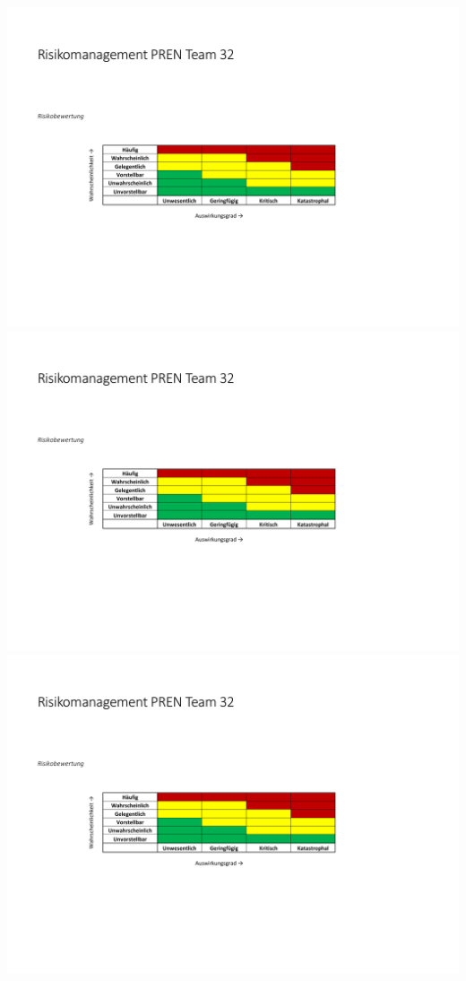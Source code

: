 \documentclass[a4paper,10pt,fleqn]{article} %
\begin{document}
\begin{appendix}
\begin{landscape}
   			\newpage  			
   			\includegraphics[page=4,scale=1,clip,trim=20mm 22mm 21mm 22mm]{Anhang/Risikomanagement.pdf}
   			\newpage  			
   			\includegraphics[page=5,scale=1,clip,trim=20mm 22mm 21mm 22mm]{Anhang/Risikomanagement.pdf}	
   			\newpage  			
   			\includegraphics[page=6,scale=1,clip,trim=20mm 22mm 21mm 22mm]{Anhang/Risikomanagement.pdf}	
   		\end{landscape} 
   		
   	\end{appendix}  
\end{document}
